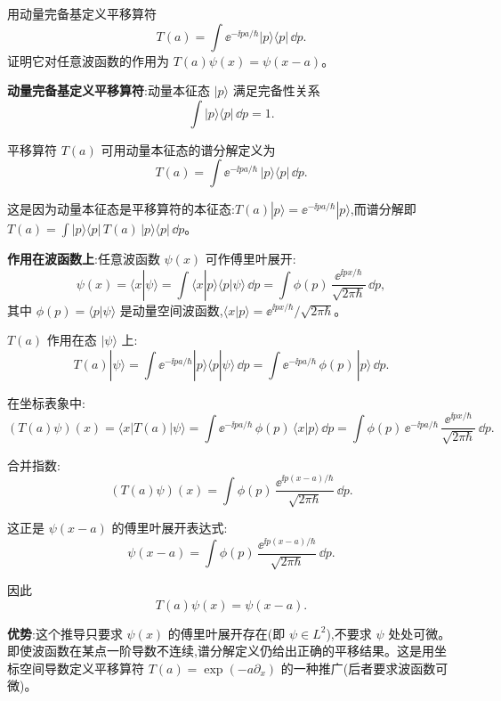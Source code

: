 \begin{question}
用动量完备基定义平移算符
\[
T(a)=\int \ee^{-\ii pa/\hbar}|p\rangle\langle p|\,\dd p.
\]
证明它对任意波函数的作用为 $T(a)\psi(x)=\psi(x-a)$。
\end{question}
\begin{solution}
	\textbf{动量完备基定义平移算符}:动量本征态 $|p\rangle$ 满足完备性关系
	\[
	\int |p\rangle\langle p|\,\dd p = 1.
	\]

	平移算符 $T(a)$ 可用动量本征态的谱分解定义为
	\[
	T(a) = \int \ee^{-\ii pa/\hbar}\,|p\rangle\langle p|\,\dd p.
	\]

	这是因为动量本征态是平移算符的本征态:$T(a)|p\rangle = \ee^{-\ii pa/\hbar}|p\rangle$,而谱分解即 $T(a)=\int |p\rangle\langle p|\,T(a)\,|p\rangle\langle p|\,\dd p$。

	\textbf{作用在波函数上}:任意波函数 $\psi(x)$ 可作傅里叶展开:
	\[
	\psi(x) = \langle x|\psi\rangle = \int \langle x|p\rangle\langle p|\psi\rangle\,\dd p
	= \int \phi(p)\,\frac{\ee^{\ii px/\hbar}}{\sqrt{2\pi\hbar}}\,\dd p,
	\]
	其中 $\phi(p)=\langle p|\psi\rangle$ 是动量空间波函数,$\langle x|p\rangle = \ee^{\ii px/\hbar}/\sqrt{2\pi\hbar}$。

	$T(a)$ 作用在态 $|\psi\rangle$ 上:
	\[
	T(a)|\psi\rangle = \int \ee^{-\ii pa/\hbar}|p\rangle\langle p|\psi\rangle\,\dd p
	= \int \ee^{-\ii pa/\hbar}\,\phi(p)\,|p\rangle\,\dd p.
	\]

	在坐标表象中:
	\[
	(T(a)\psi)(x) = \langle x|T(a)|\psi\rangle
	= \int \ee^{-\ii pa/\hbar}\,\phi(p)\,\langle x|p\rangle\,\dd p
	= \int \phi(p)\,\ee^{-\ii pa/\hbar}\,\frac{\ee^{\ii px/\hbar}}{\sqrt{2\pi\hbar}}\,\dd p.
	\]

	合并指数:
	\[
	(T(a)\psi)(x) = \int \phi(p)\,\frac{\ee^{\ii p(x-a)/\hbar}}{\sqrt{2\pi\hbar}}\,\dd p.
	\]

	这正是 $\psi(x-a)$ 的傅里叶展开表达式:
	\[
	\psi(x-a) = \int \phi(p)\,\frac{\ee^{\ii p(x-a)/\hbar}}{\sqrt{2\pi\hbar}}\,\dd p.
	\]

	因此
	\[
	\boxed{T(a)\psi(x) = \psi(x-a)}.
	\]

	\textbf{优势}:这个推导只要求 $\psi(x)$ 的傅里叶展开存在(即 $\psi\in L^2$),不要求 $\psi$ 处处可微。即使波函数在某点一阶导数不连续,谱分解定义仍给出正确的平移结果。这是用坐标空间导数定义平移算符 $T(a)=\exp(-a\partial_x)$ 的一种推广(后者要求波函数可微)。
	\end{solution}

